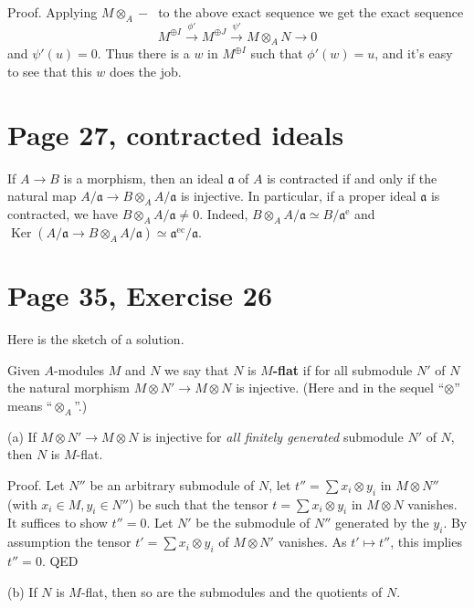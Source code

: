 \documentclass[12pt]{article}
\newcommand{\oo}{\operatorname}
\newcommand{\mf}{\mathfrak}
\begin{document}
Proof. Applying $M\otimes_A-\ $ to the above exact sequence we get the exact sequence 
$$
M^{\oplus I}\xrightarrow{\phi'}M^{\oplus J}\xrightarrow{\psi'}M\otimes_AN\to0
$$ 
and $\psi'(u)=0$. Thus there is a $w$ in $M^{\oplus I}$ such that $\phi'(w)=u$, and it's easy to see that this $w$ does the job.

\section{Page 27, contracted ideals}\label{27}%

If $A\to B$ is a morphism, then an ideal $\mf a$ of $A$ is contracted if and only if the natural map $A/\mf a\to B\otimes_A A/\mf a$ is injective. In particular, if a proper ideal $\mf a$ is contracted, we have $B\otimes_A A/\mf a\ne0$. Indeed, $B\otimes_A A/\mf a\simeq B/\mf a^{\oo e}$ and $\oo{Ker}(A/\mf a\to B\otimes_A A/\mf a)\simeq\mf a^{\oo{ec}}/\mf a$. %


\section{Page 35, Exercise 26}\label{35}%

Here is the sketch of a solution.

Given $A$-modules $M$ and $N$ we say that $N$ is $M$\textbf{-flat} if for all submodule $N'$ of $N$ the natural morphism $M\otimes N'\to M\otimes N$ is injective. (Here and in the sequel ``$\otimes$'' means ``$\otimes_A$''.) 

(a) If $M\otimes N'\to M\otimes N$ is injective for \emph{all finitely generated} submodule $N'$ of $N$, then $N$ is $M$-flat.

Proof. Let $N''$ be an arbitrary submodule of $N$, let $t''=\sum x_i\otimes y_i$ in $M\otimes N''$ (with $x_i\in M,y_i\in N''$) be such that the tensor $t=\sum x_i\otimes y_i$ in $M\otimes N$ vanishes. It suffices to show $t''=0$. Let $N'$ be the submodule of $N''$ generated by the $y_i$. By assumption the tensor $t'=\sum x_i\otimes y_i$ of $M\otimes N'$ vanishes. As $t'\mapsto t''$, this implies $t''=0$. QED

(b) If $N$ is $M$-flat, then so are the submodules and the quotients of $N$. 
\end{document}
